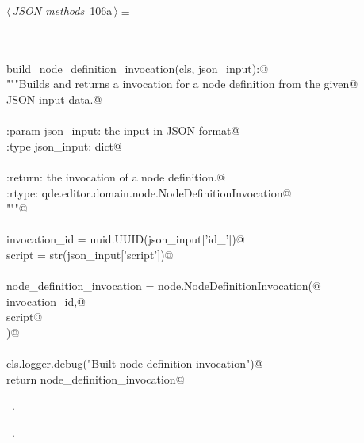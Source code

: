 \documentclass[
    a4paper,      %
    10pt,         %
    openright,    %
    notitlepage,  %
    parskip=half, %
]{scrreprt}       %
\theoremstyle{definition}                    %
\begin{document}
\begin{flushleft} \small
\begin{minipage}{\linewidth}\label{scrap173}\raggedright\small
{} $\langle\,${\itshape JSON methods}\nobreak\ {\footnotesize {106a}}$\,\rangle\equiv$
\vspace{-1exm}
\begin{list}{}{} \item
\mbox{}\lstinline@@\\
\mbox{}\lstinline@classmethod@\\
\mbox{}\lstinline@def build_node_definition_invocation(cls, json_input):@\\
\mbox{}\lstinline@    """Builds and returns a invocation for a node definition from the given@\\
\mbox{}\lstinline@    JSON input data.@\\
\mbox{}\lstinline@@\\
\mbox{}\lstinline@    :param json_input: the input in JSON format@\\
\mbox{}\lstinline@    :type  json_input: dict@\\
\mbox{}\lstinline@@\\
\mbox{}\lstinline@    :return: the invocation of a node definition.@\\
\mbox{}\lstinline@    :rtype:  qde.editor.domain.node.NodeDefinitionInvocation@\\
\mbox{}\lstinline@    """@\\
\mbox{}\lstinline@@\\
\mbox{}\lstinline@    invocation_id = uuid.UUID(json_input['id_'])@\\
\mbox{}\lstinline@    script        = str(json_input['script'])@\\
\mbox{}\lstinline@@\\
\mbox{}\lstinline@    node_definition_invocation = node.NodeDefinitionInvocation(@\\
\mbox{}\lstinline@        invocation_id,@\\
\mbox{}\lstinline@        script@\\
\mbox{}\lstinline@    )@\\
\mbox{}\lstinline@@\\
\mbox{}\lstinline@    cls.logger.debug("Built node definition invocation")@\\
\mbox{}\lstinline@    return node_definition_invocation@\\
\mbox{}\lstinline@@{\NWsep}
\end{list}
\vspace{-1.5ex}
\footnotesize
\begin{list}{}{\setlength{\itemsep}{-\parsep}\setlength{\itemindent}{-\leftmargin}}
\item \NWtxtMacroDefBy\ .
\item \NWtxtMacroRefIn\ .


\end{list}
\end{minipage}
\end{flushleft}
\end{document}
